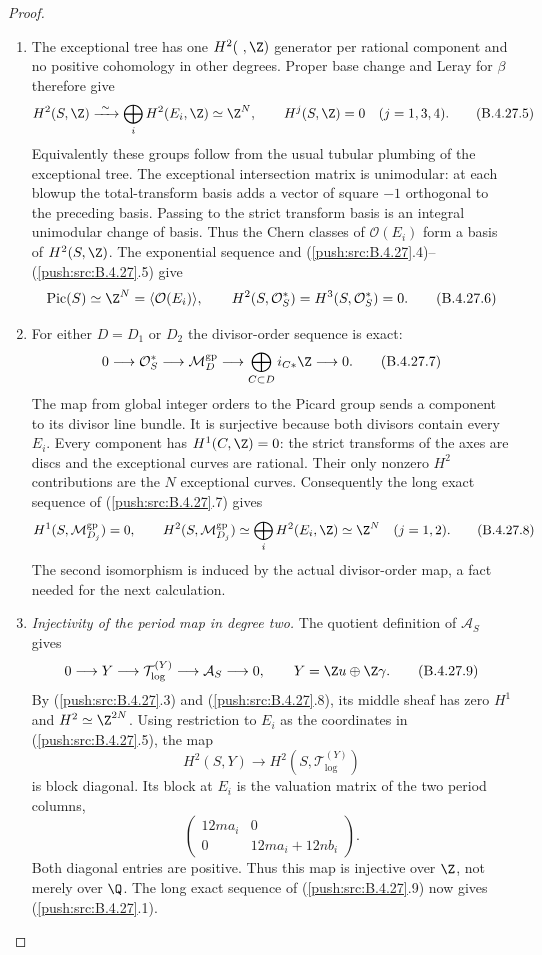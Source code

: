 \begin{proof}
\begin{enumerate}[label=\arabic*.,leftmargin=*]
\item The exceptional tree has one $H^2(\ ,\Z)$
generator per rational component and no positive
cohomology in other degrees. Proper base change
and Leray for $\beta$ therefore give
\[
 H^2(S,\Z)\xrightarrow{\ \sim\ }
       \bigoplus_i H^2(E_i,\Z)\simeq\Z^N,
 \qquad H^j(S,\Z)=0\quad(j=1,3,4).
 \tag{B.4.27.5}
\]
Equivalently these groups follow from the usual
tubular plumbing of the exceptional tree.
The exceptional intersection matrix is
unimodular: at each blowup the total-transform
basis adds a vector of square $-1$ orthogonal
to the preceding basis. Passing to the strict
transform basis is an integral unimodular
change of basis. Thus the Chern classes of
$\mathcal O(E_i)$ form a basis of
$H^2(S,\Z)$. The exponential sequence and
(\ref{push:src:B.4.27}.4)--(\ref{push:src:B.4.27}.5) give
\[
 \operatorname{Pic}(S)\simeq\Z^N
       =\langle\mathcal O(E_i)\rangle,
 \qquad
 H^2(S,\mathcal O_S^*)=H^3(S,\mathcal O_S^*)=0.
 \tag{B.4.27.6}
\]

\item For either $D=D_1$ or $D_2$ the divisor-order
sequence is exact:
\[
 0\longrightarrow\mathcal O_S^*
 \longrightarrow\mathcal M_D^{\mathrm{gp}}
 \longrightarrow
   \bigoplus_{C\subset D}i_{C*}\Z
 \longrightarrow0.
 \tag{B.4.27.7}
\]
The map from global integer orders to the Picard
group sends a component to its divisor line
bundle. It is surjective because both divisors
contain every $E_i$. Every component has
$H^1(C,\Z)=0$: the strict transforms of the
axes are discs and the exceptional curves are
rational. Their only nonzero $H^2$ contributions
are the $N$ exceptional curves. Consequently
the long exact sequence of (\ref{push:src:B.4.27}.7) gives
\[
 H^1(S,\mathcal M_{D_j}^{\mathrm{gp}})=0,
 \qquad
 H^2(S,\mathcal M_{D_j}^{\mathrm{gp}})
       \simeq\bigoplus_i H^2(E_i,\Z)
       \simeq\Z^N\quad(j=1,2).
 \tag{B.4.27.8}
\]
The second isomorphism is induced by the actual
divisor-order map, a fact needed for the next
calculation.

\item \emph{Injectivity of the period map in degree two.}
The quotient definition of $\mathcal A_S$ gives
\[
 0\longrightarrow Y\longrightarrow
 \mathcal T_{\log}^{(Y)}\longrightarrow
 \mathcal A_S\longrightarrow0,
 \qquad Y=\Z u\oplus\Z\gamma.
 \tag{B.4.27.9}
\]
By (\ref{push:src:B.4.27}.3) and (\ref{push:src:B.4.27}.8), its middle
sheaf has zero $H^1$ and $H^2\simeq\Z^{2N}$.
Using restriction to $E_i$ as the coordinates
in (\ref{push:src:B.4.27}.5), the map
\[
 H^2(S,Y)\longrightarrow
 H^2(S,\mathcal T_{\log}^{(Y)})
\]
is block diagonal. Its block at $E_i$ is the
valuation matrix of the two period columns,
\[
 \begin{pmatrix}
 12m a_i&0\\0&12m a_i+12n b_i
 \end{pmatrix}.
 \tag{B.4.27.10}
\]
Both diagonal entries are positive. Thus this
map is injective over $\Z$, not merely over
$\Q$. The long exact sequence of
(\ref{push:src:B.4.27}.9) now gives (\ref{push:src:B.4.27}.1).


\end{enumerate}
\end{proof}
